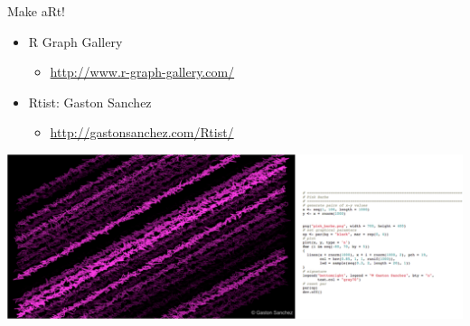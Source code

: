 \documentclass[ignorenonframetext,]{beamer}
\providecommand{\tightlist}{%
  \setlength{\itemsep}{0pt}\setlength{\parskip}{0pt}}
\begin{document}
\begin{frame}{Make aRt!}
\protect\hypertarget{make-art}{}

\begin{itemize}
\tightlist
\item
  R Graph Gallery

  \begin{itemize}
  \tightlist
  \item
    \url{http://www.r-graph-gallery.com/}
  \end{itemize}
\item
  Rtist: Gaston Sanchez

  \begin{itemize}
  \tightlist
  \item
    \url{http://gastonsanchez.com/Rtist/}
  \end{itemize}
\end{itemize}

\includegraphics{../external/images/funR_5_aRt_pink_combo.png}

\end{frame}
\end{document}

